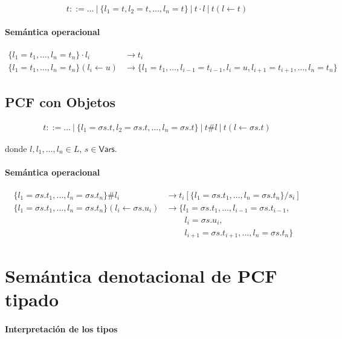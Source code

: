 \documentclass[twoside,a4paper,12pt]{article}
\theoremstyle{definition}
\theoremstyle{remark}
\begin{document}
\begin{equation*}
  t ::= \dots~|~\{l_1=t,l_2=t,\dots,l_n=t\}~|~t\cdot l~|~t(l\leftarrow t)
\end{equation*}

\paragraph{Semántica operacional}

\begin{align*}
  \{l_1=t_1,\dots,l_n=t_n\}\cdot l_i &\to t_i\\
  \{l_1=t_1,\dots,l_n=t_n\}(l_i\leftarrow u) &\to
  \{l_1=t_1,\dots,l_{i-1}=t_{i-1},l_i=u,l_{i+1}=t_{i+1},\dots,l_n=t_n\}
\end{align*}

\subsection*{PCF con Objetos}

\begin{align*}
  t ::= \dots~|~\{l_1=\sigma s.t,l_2=\sigma s.t,\dots,l_n=\sigma s.t\}~|~t\#l~|~t(l\leftarrow \sigma s.t)
\end{align*}

donde $l,l_1,\dots,l_n\in L$, $s\in\mathsf{Vars}$.

\paragraph{Semántica operacional}

\begin{align*}
  \{l_1 = \sigma s.t_1,\dots,l_n = \sigma s.t_n\}\#l_i
    &\to t_i[\{l_1 = \sigma s.t_1,\dots,l_n = \sigma s.t_n\}/s_i] \\
  \{l_1 = \sigma s.t_1,\dots,l_n = \sigma s.t_n\}(l_i\leftarrow\sigma s.u_i)
    &\to \{l_1 = \sigma s.t_1,\dots,l_{i-1} = \sigma s.t_{i-1}, \\
    &~\qquad l_i = \sigma s.u_i, \\
    &~\qquad l_{i+1} = \sigma s.t_{i+1},\dots,l_n = \sigma s.t_n\}
\end{align*}

\section*{Semántica denotacional de PCF tipado}

\paragraph{Interpretación de los tipos}
\end{document}
